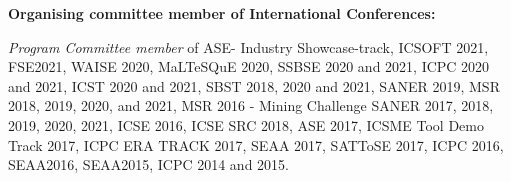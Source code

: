 \documentclass[12pt]{article}
\newcommand\on[1]{\nbc{ON}{#1}{red}} %
\begin{document}
\textbf{Organising committee member of International Conferences:}
\begin{innerlist}
 \item \textit{Program Committee member} of ASE- Industry Showcase-track, ICSOFT 2021, FSE2021, WAISE 2020, MaLTeSQuE 2020, SSBSE 2020 and 2021, ICPC 2020 and 2021, ICST 2020 and 2021, SBST 2018, 2020 and 2021, SANER 2019, MSR 2018, 2019, 2020, and 2021, MSR 2016 - Mining Challenge SANER 2017, 2018, 2019, 2020, 2021, ICSE 2016, ICSE SRC 2018, ASE 2017, ICSME Tool Demo
Track 2017, ICPC ERA TRACK 2017, SEAA 2017, SATToSE 2017, ICPC 2016, SEAA2016, SEAA2015, ICPC 2014 and 2015.
 
%
%
%
%
%

\end{innerlist}
\end{document}
